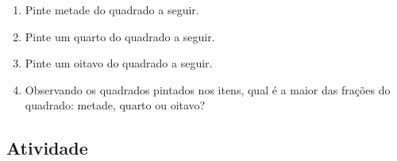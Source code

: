 \begin{enumerate} [\quad a)] %
  \item     Pinte metade do quadrado a seguir.
  
  \begin{center}
  \end{center}
 
  \item     Pinte um quarto do quadrado a seguir.
  
  \begin{center}
  \end{center}

  \item     Pinte um oitavo do quadrado a seguir.
  
  \begin{center}
  \end{center}
  \item     Observando os quadrados pintados nos itens, qual é a maior das frações do quadrado: metade, quarto ou oitavo?
\end{enumerate} %


\subsection{Atividade}

